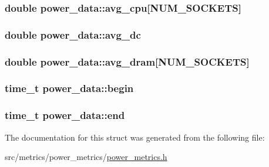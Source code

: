 \subsubsection[{\texorpdfstring{avg\+\_\+cpu}{avg_cpu}}]{\setlength{\rightskip}{0pt plus 5cm}double power\+\_\+data\+::avg\+\_\+cpu\mbox{[}{\bf N\+U\+M\+\_\+\+S\+O\+C\+K\+E\+TS}\mbox{]}}\hypertarget{structpower__data_a47b28e3d302b9ac37fb948b653a74274}{}\label{structpower__data_a47b28e3d302b9ac37fb948b653a74274}
\subsubsection[{\texorpdfstring{avg\+\_\+dc}{avg_dc}}]{\setlength{\rightskip}{0pt plus 5cm}double power\+\_\+data\+::avg\+\_\+dc}\hypertarget{structpower__data_af27803e682e8f281c1d108af766b739d}{}\label{structpower__data_af27803e682e8f281c1d108af766b739d}
\subsubsection[{\texorpdfstring{avg\+\_\+dram}{avg_dram}}]{\setlength{\rightskip}{0pt plus 5cm}double power\+\_\+data\+::avg\+\_\+dram\mbox{[}{\bf N\+U\+M\+\_\+\+S\+O\+C\+K\+E\+TS}\mbox{]}}\hypertarget{structpower__data_a3312f37327970fc86b32128e464885a6}{}\label{structpower__data_a3312f37327970fc86b32128e464885a6}
\subsubsection[{\texorpdfstring{begin}{begin}}]{\setlength{\rightskip}{0pt plus 5cm}time\+\_\+t power\+\_\+data\+::begin}\hypertarget{structpower__data_afa9f8e3bb7aad76d4c6480735c0e6f74}{}\label{structpower__data_afa9f8e3bb7aad76d4c6480735c0e6f74}
\subsubsection[{\texorpdfstring{end}{end}}]{\setlength{\rightskip}{0pt plus 5cm}time\+\_\+t power\+\_\+data\+::end}\hypertarget{structpower__data_a4502036bc99f455f00974cadfb642a11}{}\label{structpower__data_a4502036bc99f455f00974cadfb642a11}


The documentation for this struct was generated from the following file\+:\begin{DoxyCompactItemize}
\item 
src/metrics/power\+\_\+metrics/\hyperlink{power__metrics_8h}{power\+\_\+metrics.\+h}\end{DoxyCompactItemize}
